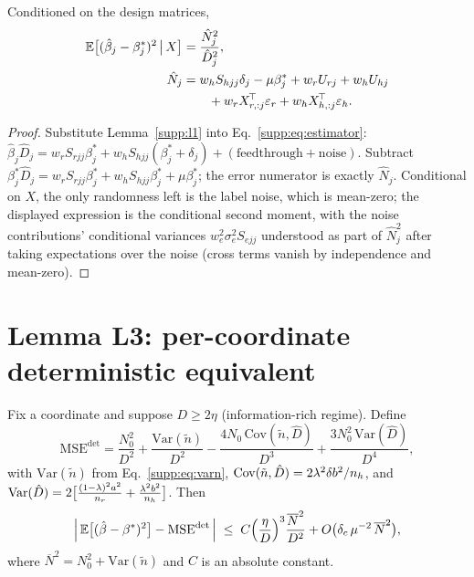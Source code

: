 \begin{lemma}\label{supp:l2}
Conditioned on the design matrices,
\begin{equation}
\begin{aligned}
  \mathbb{E}\big[(\hat\beta_j - \beta^*_j)^2 \,\big|\, X\big] &= \frac{\hat N_j^2}{\hat D_j^2},\\
  \hat N_j &= w_h S_{hjj}\delta_j - \mu\beta^*_j + w_r U_{rj} + w_h U_{hj}\\
  &\qquad + w_r X_{r,:j}^{\!\top}\varepsilon_r + w_h X_{h,:j}^{\!\top}\varepsilon_h .
\end{aligned}
  \label{supp:eq:l2}
\end{equation}
\end{lemma}

\begin{proof}
Substitute Lemma~\ref{supp:l1} into Eq.~\eqref{supp:eq:estimator}:
$\hat\beta_j \hat D_j = w_r S_{rjj}\beta^*_j + w_h S_{hjj}(\beta^*_j + \delta_j) + (\text{feedthrough} + \text{noise})$.
Subtract $\beta^*_j \hat D_j = w_r S_{rjj}\beta^*_j + w_h S_{hjj}\beta^*_j + \mu\beta^*_j$; the error numerator is exactly $\hat N_j$.
Conditional on $X$, the only randomness left is the label noise, which is mean-zero; the displayed expression is the conditional second moment, with the noise contributions' conditional variances $w_e^2 \sigma_e^2 S_{ejj}$ understood as part of $\hat N_j^2$ after taking expectations over the noise (cross terms vanish by independence and mean-zero).
\end{proof}

\section{Lemma L3: per-coordinate deterministic equivalent}
\label{supp:l3}

\begin{lemma}[L3]\label{supp:l3lem}
Fix a coordinate and suppose $D \ge 2\eta$ (information-rich regime).
Define
\begin{equation}
  \mathrm{MSE}^{\det} = \frac{N_0^2}{D^2} + \frac{\mathrm{Var}(\tilde n)}{D^2} - \frac{4 N_0\, \mathrm{Cov}(\tilde n, \hat D)}{D^3} + \frac{3 N_0^2\, \mathrm{Var}(\hat D)}{D^4},
  \label{supp:eq:msedet}
\end{equation}
with $\mathrm{Var}(\tilde n)$ from Eq.~\eqref{supp:eq:varn}, $\mathrm{Cov}(\tilde n, \hat D) = 2\lambda^2 \delta b^2 / n_h$, and $\mathrm{Var}(\hat D) = 2\big[\frac{(1-\lambda)^2 a^2}{n_r} + \frac{\lambda^2 b^2}{n_h}\big]$.
Then
\begin{equation}
  \Big|\, \mathbb{E}\big[(\hat\beta - \beta^*)^2\big] - \mathrm{MSE}^{\det} \,\Big|
  \;\le\; C\Big(\frac{\eta}{D}\Big)^3 \frac{\overline{N}^2}{D^2} + O\big(\delta_c\, \mu^{-2}\, \overline{N}^2\big),
  \label{supp:eq:l3bound}
\end{equation}
where $\overline{N}^2 = N_0^2 + \mathrm{Var}(\tilde n)$ and $C$ is an absolute constant.
\end{lemma}

